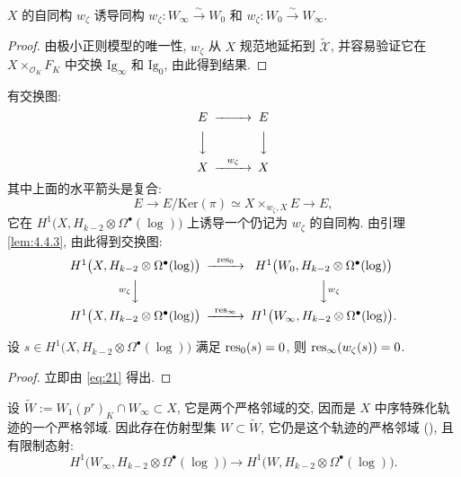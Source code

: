 \begin{lemma}\label{lem:4.4.3}
$X$ 的自同构 $w_{\zeta}$ 诱导同构 $w_{\zeta} : W_{\infty} \xrightarrow{\sim} W_0$ 和 $w_{\zeta} : W_0 \xrightarrow{\sim} W_{\infty}$.
\end{lemma}

\begin{proof}
由极小正则模型的唯一性, $w_{\zeta}$ 从 $X$ 规范地延拓到 $\widetilde{\mathcal{X}}$, 并容易验证它在 $X \times_{\mathcal{O}_K} F_K$ 中交换 $\mathrm{Ig}_{\infty}$ 和 $\mathrm{Ig}_0$, 由此得到结果.
\end{proof}

有交换图:
\[
\begin{CD}
E @>>> E\\
@VVV @VVV\\
X @>{w_{\zeta}}>> X
\end{CD}
\]
其中上面的水平箭头是复合:
\[
E \to E/\mathrm{Ker}(\pi) \simeq X \times_{w_{\zeta},X} E \to E,
\]
它在 $H^{1}\bigl(X,H_{k-2} \otimes \Omega^{\bullet}(\log)\bigr)$ 上诱导一个仍记为 $w_{\zeta}$ 的自同构.
由引理 \ref{lem:4.4.3}, 由此得到交换图:
\begin{equation}
\label{eq:21}
\begin{CD}
H^{1}\bigl(X,H_{k-2} \otimes \Omega^{\bullet}(\log)\bigr) @>{\res_0}>> H^{1}\bigl(W_0,H_{k-2} \otimes \Omega^{\bullet}(\log)\bigr)\\
@V{w_{\zeta}}VV @VV{w_{\zeta}}V\\
H^{1}\bigl(X,H_{k-2} \otimes \Omega^{\bullet}(\log)\bigr) @>{\res_{\infty}}>> H^{1}\bigl(W_{\infty},H_{k-2} \otimes \Omega^{\bullet}(\log)\bigr).
\end{CD}
\end{equation}

\begin{lemma}\label{lem:4.4.4}
设 $s \in H^{1}\bigl(X,H_{k-2} \otimes \Omega^{\bullet}(\log)\bigr)$ 满足 $\operatorname{res}_0(s) = 0$, 则 $\operatorname{res}_{\infty}(w_{\zeta}(s)) = 0$.
\end{lemma}

\begin{proof}
立即由 \eqref{eq:21} 得出.
\end{proof}

设 $\widetilde{W} := W_1(p^{r})_K \cap W_{\infty} \subset X$, 它是两个严格邻域的交, 因而是 $X$ 中序特殊化轨迹的一个严格邻域.
因此存在仿射型集 $W \subset \widetilde{W}$, 它仍是这个轨迹的严格邻域 (\cite[\S1.2]{ref:5}), 且有限制态射:
\begin{equation}
\label{eq:22}
H^{1}\bigl(W_{\infty},H_{k-2} \otimes \Omega^{\bullet}(\log)\bigr) \to H^{1}\bigl(W,H_{k-2} \otimes \Omega^{\bullet}(\log)\bigr).
\end{equation}

